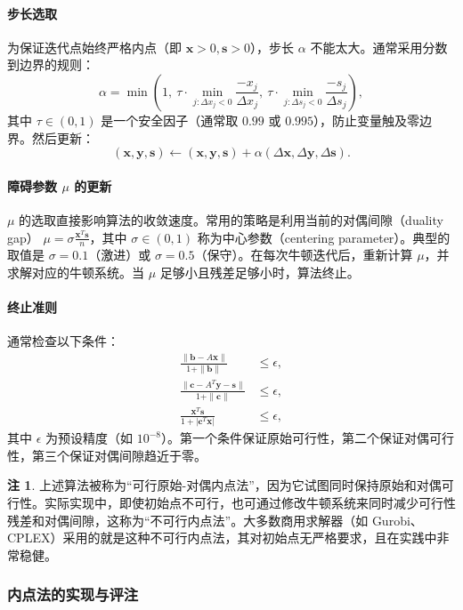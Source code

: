 \documentclass[12pt]{article}
\theoremstyle{plain}
\theoremstyle{definition}
\newtheorem{rmk}{注}[subsection]
\begin{document}
\paragraph{步长选取}
为保证迭代点始终严格内点（即 $\bm{x}>0,\bm{s}>0$），步长 $\alpha$ 不能太大。通常采用分数到边界的规则：
\[
\alpha = \min\left(1, \ \tau \cdot \min_{j: \Delta x_j < 0} \frac{-x_j}{\Delta x_j}, \ \tau \cdot \min_{j: \Delta s_j < 0} \frac{-s_j}{\Delta s_j}\right),
\]
其中 $\tau \in (0,1)$ 是一个安全因子（通常取 $0.99$ 或 $0.995$），防止变量触及零边界。然后更新：
\[
(\bm{x},\bm{y},\bm{s}) \leftarrow (\bm{x},\bm{y},\bm{s}) + \alpha (\Delta \bm{x}, \Delta \bm{y}, \Delta \bm{s}).
\]

\paragraph{障碍参数 $\mu$ 的更新}
$\mu$ 的选取直接影响算法的收敛速度。常用的策略是利用当前的对偶间隙（duality gap） $\mu = \sigma \frac{\bm{x}^T\bm{s}}{n}$，其中 $\sigma \in (0,1)$ 称为中心参数（centering parameter）。典型的取值是 $\sigma = 0.1$（激进）或 $\sigma = 0.5$（保守）。在每次牛顿迭代后，重新计算 $\mu$，并求解对应的牛顿系统。当 $\mu$ 足够小且残差足够小时，算法终止。

\paragraph{终止准则}
通常检查以下条件：
\begin{align*}
\frac{\|\bm{b} - A\bm{x}\|}{1+\|\bm{b}\|} &\leq \epsilon, \\
\frac{\|\bm{c} - A^T\bm{y} - \bm{s}\|}{1+\|\bm{c}\|} &\leq \epsilon, \\
\frac{\bm{x}^T\bm{s}}{1+|\bm{c}^T\bm{x}|} &\leq \epsilon,
\end{align*}
其中 $\epsilon$ 为预设精度（如 $10^{-8}$）。第一个条件保证原始可行性，第二个保证对偶可行性，第三个保证对偶间隙趋近于零。

\begin{rmk}
    上述算法被称为“可行原始-对偶内点法”，因为它试图同时保持原始和对偶可行性。实际实现中，即使初始点不可行，也可通过修改牛顿系统来同时减少可行性残差和对偶间隙，这称为“不可行内点法”。大多数商用求解器（如 Gurobi、CPLEX）采用的就是这种不可行内点法，其对初始点无严格要求，且在实践中非常稳健。
\end{rmk}

\subsubsection{内点法的实现与评注}\label{subsubsec:interior_remarks}
\end{document}
